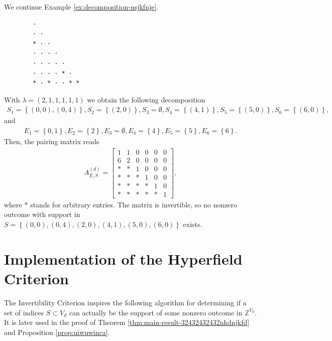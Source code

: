 \begin{example}
    We continue Example \ref{ex:decomposition-nsjkfnje}. 
    \begin{verbatim}
        · 
        · · 
        * · · 
        · · · · 
        · · · · · 
        · · · · * · 
        * · * · · * *
    \end{verbatim}
    With \( \lambda = (2,1,1,1,1,1) \) we obtain the following decomposition
    \begin{align*}
        S_1 = \left\{ (0,0), (0,4) \right\}, S_2 = \left\{ (2,0) \right\}, S_3 = \emptyset, S_4 = \left\{ (4,1) \right\}, S_5 = \left\{ (5,0) \right\}, S_6 = \left\{ (6,0) \right\},
    \end{align*}
    and
    \begin{align*}
        E_1 = \left\{ 0, 1 \right\}, E_2 = \left\{ 2 \right\}, E_3 = \emptyset, E_4 = \left\{ 4 \right\}, E_5 = \left\{ 5 \right\}, E_6 = \left\{ 6 \right\}.
    \end{align*}
    Then, the pairing matrix reads 
    \begin{align*}
        A^{(d)}_{E,S} = \begin{bmatrix}
            1 & 1 & 0 & 0 & 0 & 0 \\
            6 & 2 & 0 & 0 & 0 & 0 \\
            * & * & 1 & 0 & 0 & 0 \\
            * & * & * & 1 & 0 & 0 \\
            * & * & * & * & 1 & 0 \\
            * & * & * & * & * & 1
        \end{bmatrix},
    \end{align*}
    where \( * \) stands for arbitrary entries. The matrix is invertible, so no nonzero outcome with support in \( S = \left\{ (0,0), (0,4), (2,0), (4,1), (5,0), (6,0) \right\} \) exists.
\end{example}

\section{Implementation of the Hyperfield Criterion}

The Invertibility Criterion inspires the following algorithm for determining if a set of indices \( S \subset V_d \) can actually be the support of some nonzero outcome in \( \mathbb{Z}^{V_d} \). It is later used in the proof of Theorem \ref{thm:main-result-32432432432nkdnjkfd} and Proposition \ref{prop:uiwuwinca}.

